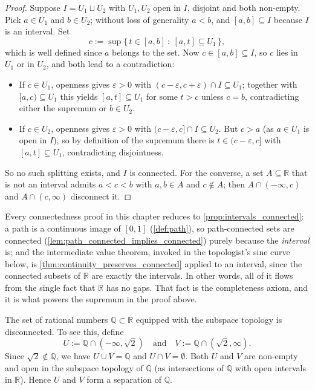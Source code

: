 \begin{proof}
Suppose $I = U_1 \sqcup U_2$ with $U_1, U_2$ open in $I$, disjoint and both non-empty. Pick
$a \in U_1$ and $b \in U_2$; without loss of generality $a<b$, and $[a,b] \subseteq I$ because
$I$ is an interval. Set
\[c := \sup\{\,t \in [a,b] \ :\ [a,t] \subseteq U_1\,\},\]
which is well defined since $a$ belongs to the set. Now $c \in [a,b] \subseteq I$, so $c$ lies
in $U_1$ or in $U_2$, and both lead to a contradiction:
\begin{itemize}
  \item If $c \in U_1$, openness gives $\varepsilon>0$ with $(c-\varepsilon,c+\varepsilon)\cap I
    \subseteq U_1$; together with $[a,c) \subseteq U_1$ this yields $[a,t] \subseteq U_1$ for
    some $t>c$ unless $c=b$, contradicting either the supremum or $b \in U_2$.
  \item If $c \in U_2$, openness gives $\varepsilon>0$ with $(c-\varepsilon,c] \cap I \subseteq
    U_2$. But $c>a$ (as $a \in U_1$ is open in $I$), so by definition of the supremum there is
    $t \in (c-\varepsilon,c]$ with $[a,t] \subseteq U_1$, contradicting disjointness.
\end{itemize}
So no such splitting exists, and $I$ is connected. For the converse, a set $A \subseteq
\mathbb{R}$ that is not an interval admits $a<c<b$ with $a,b \in A$ and $c \notin A$; then
$A \cap (-\infty,c)$ and $A \cap (c,\infty)$ disconnect it.
\end{proof}

\begin{remark}
\label{rem:intervals_are_the_base_case}
Every connectedness proof in this chapter reduces to \cref{prop:intervals_connected}: a path is
a continuous image of $[0,1]$ (\cref{def:path}), so path-connected sets are connected
(\cref{lem:path_connected_implies_connected}) purely because the \emph{interval} is; and the
intermediate value theorem, invoked in the topologist's sine curve below, is
\cref{thm:continuity_preserves_connected} applied to an interval, since the connected subsets of
$\mathbb{R}$ are exactly the intervals. In other words, all of it flows from the single fact that
$\mathbb{R}$ has no gaps. That fact is the completeness axiom, and it is what powers the supremum
in the proof above.
\end{remark}

\begin{aiexample}
The set of rational numbers $\mathbb{Q} \subset \mathbb{R}$ equipped with the subspace topology is disconnected. To see this, define
\[
U := \mathbb{Q} \cap (-\infty, \sqrt{2}) \quad \text{and} \quad V := \mathbb{Q} \cap (\sqrt{2}, \infty).
\]
Since $\sqrt{2} \notin \mathbb{Q}$, we have $U \cup V = \mathbb{Q}$ and $U \cap V = \emptyset$. Both $U$ and $V$ are non-empty and open in the subspace topology of $\mathbb{Q}$ (as intersections of $\mathbb{Q}$ with open intervals in $\mathbb{R}$). Hence $U$ and $V$ form a separation of $\mathbb{Q}$.
\end{aiexample}

